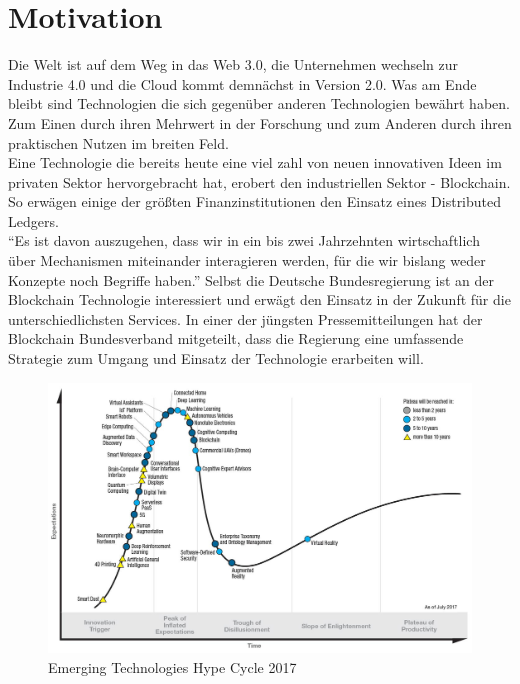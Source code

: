 \section{Motivation}

Die Welt ist auf dem Weg in das Web 3.0, die Unternehmen wechseln zur Industrie 4.0 und die Cloud kommt demnächst in Version 2.0. Was am Ende bleibt sind Technologien die sich gegenüber anderen Technologien bewährt haben. Zum Einen durch ihren Mehrwert in der Forschung und zum Anderen durch ihren praktischen Nutzen im breiten Feld.\\
Eine Technologie die bereits heute eine viel zahl von neuen innovativen Ideen im privaten Sektor hervorgebracht hat, erobert den industriellen Sektor - Blockchain. So erwägen einige der größten Finanzinstitutionen den Einsatz eines Distributed Ledgers.\cite{Goldman2018}\cite{JPMorgan2018}\\

“Es ist davon auszugehen, dass wir in ein bis zwei Jahrzehnten wirtschaftlich über Mechanismen miteinander interagieren werden, für die wir bislang weder Konzepte noch Begriffe haben.”\cite[S.~92]{Platzer2014} Selbst die Deutsche Bundesregierung ist an der Blockchain Technologie interessiert und erwägt den Einsatz in der Zukunft für die unterschiedlichsten Services. In einer der jüngsten Pressemitteilungen hat der Blockchain Bundesverband mitgeteilt, dass die Regierung eine umfassende Strategie zum Umgang und Einsatz der Technologie erarbeiten will.\cite{BCBundesverband2018}

\begin{figure}[h!]
	\centering
	\includegraphics[width=0.79\linewidth]{pictures/Gartner-Hype-Cycle-2017}
	\caption[Gartner Hype Cycle 2017]{Emerging Technologies Hype Cycle 2017\cite{Gartner2017}}
	\label{fig:gartner-hype-cycle-2017}
\end{figure}

